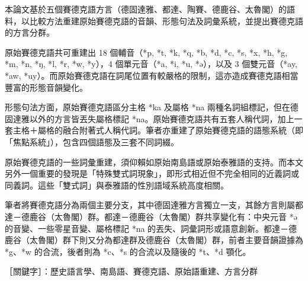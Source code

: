 \vspace{-1.25cm}
本論文基於五個賽德克語方言（德固達雅、都達、陶賽、德鹿谷、太魯閣）的語料，以比較方法重建原始賽德克語的音韻、形態句法及詞彙系統，並提出賽德克語的方言分群。

原始賽德克語共可重建出 18 個輔音（*p, *t, *k, *q, *b, *d, *c, *s, *x, *h, *g, *m, *n, *ŋ, *l, *r, *w, *y），4 個單元音（*a, *i, *u, *ə），以及 3 個雙元音（*ay, *aw, *uy）。而原始賽德克語在詞尾位置有較嚴格的限制，這亦造成賽德克語相當豐富的形態音韻變化。

形態句法方面，原始賽德克語區分主格 *ka 及屬格 *na 兩種名詞組標記，但在德固達雅以外的方言皆丟失屬格標記 *na。原始賽德克語共有五套人稱代詞，加上一套主格＋屬格的融合附著式人稱代詞。筆者亦重建了原始賽德克語的語態系統（即「焦點系統」），包含四個語態及三套不同詞綴。

原始賽德克語的一些詞彙重建，須仰賴如原始南島語或原始泰雅語的支持。而本文另外一個重要的發現是「特殊雙式詞現象」，即形式相近但不完全相同的近義詞或同義詞。這些「雙式詞」與泰雅語的性別語域系統高度相關。

筆者將賽德克語分為兩個主要分支，其中德固達雅方言獨立一支，其餘方言則屬都達－德鹿谷（太魯閣）群。都達－德鹿谷（太魯閣）群共享變化有：中央元音 *ə 的音變、一些零星音變、屬格標記 *na 的丟失、詞彙詞形或語意創新。都達－德鹿谷（太魯閣）群下則又分為都達群及德鹿谷（太魯閣）群，前者主要音韻證據為 *g、*w 的合流，後者則為 *c、*s 的合流以及隨後的 *t、*d 顎化。

\noindent ［關鍵字］：歷史語言學、南島語、賽德克語、原始語重建、方言分群